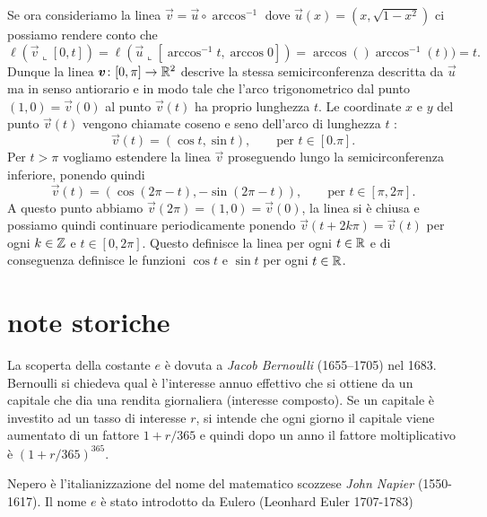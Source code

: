 Se ora consideriamo la linea $\vec v = \vec u \circ \arccos^{-1}$
dove $\vec u(x)=(x,\sqrt{1-x^2})$ ci possiamo rendere conto 
che 
\[
 \ell(\vec v\llcorner [0,t])  
 = \ell(\vec u\llcorner[\arccos^{-1} t,\arccos 0])
 = \arccos ()\arccos^{-1} (t)) = t.
\]
Dunque la linea $\boldsymbol v\colon[0,\pi]\to{\mathbb R}^2$ descrive la stessa
semicirconferenza descritta da $\vec u$ ma in senso antiorario 
e in modo tale che l'arco trigonometrico dal punto $(1,0)=\vec v(0)$ 
al punto $\vec v(t)$ ha proprio lunghezza $t$.
Le coordinate $x$ e $y$ del punto $\vec v(t)$ vengono chiamate 
coseno e seno dell'arco di lunghezza $t$%
:
\[
  \vec v(t) = (\cos t, \sin t), \qquad\text{per $t\in[0.\pi]$}.  
\]
Per $t>\pi$ vogliamo estendere la linea $\vec v$ proseguendo 
lungo la semicirconferenza inferiore, ponendo quindi 
\[
  \vec v(t) = (\cos (2\pi - t), -\sin (2\pi - t)), \qquad \text{per $t\in[\pi,2\pi]$}.  
\]
A questo punto abbiamo $\vec v(2 \pi) = (1,0) = \vec v(0)$, la linea si è chiusa 
e possiamo quindi continuare periodicamente ponendo $\vec v(t+2 k \pi) = \vec v(t)$ 
per ogni $k\in {\mathbb Z}$ e $t\in[0,2\pi]$.
Questo definisce la linea per ogni $t\in {\mathbb R}$ e di conseguenza 
definisce le funzioni $\cos t$ e $\sin t$ per ogni $t\in {\mathbb R}$.

\section{note storiche}

\label{note:Bernoulli}%
%
La scoperta della costante $e$
è dovuta a \emph{Jacob Bernoulli} (1655--1705) nel 1683.
Bernoulli si chiedeva qual è l'interesse annuo effettivo
che si ottiene da un capitale che dia una rendita
giornaliera (interesse composto).
Se un capitale è investito ad un tasso di interesse $r$,
si intende che ogni giorno il capitale
viene aumentato di un fattore $1+r/365$
e quindi dopo un anno il fattore moltiplicativo è $(1+r/365)^{365}$.

\label{nota:Nepero}%
%
%
\label{Euler!Leonhard}%
\label{Eulero}%
Nepero è l'italianizzazione del nome del
matematico scozzese \emph{John Napier} (1550-1617).
Il nome $e$ è stato introdotto da Eulero (Leonhard Euler 1707-1783)

